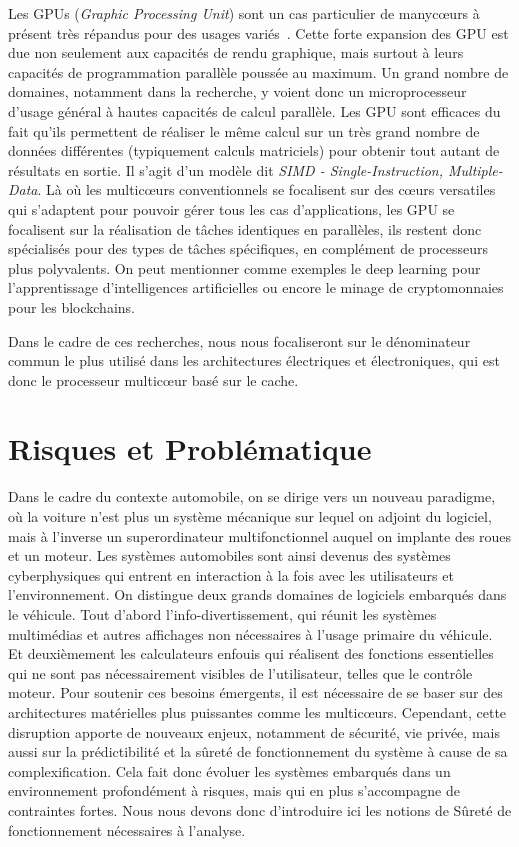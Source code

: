 \documentclass[french, a4paper, 11pt, twoside, pdftex]{StyleThese}
\begin{document}
		Les GPUs (\emph{Graphic Processing Unit}) sont un cas particulier de manycœurs à présent très répandus pour des usages variés~\cite{owens_gpu_2008}. Cette forte expansion des GPU est due non seulement aux capacités de rendu graphique, mais surtout à leurs capacités de programmation parallèle poussée au maximum. Un grand nombre de domaines, notamment dans la recherche, y voient donc un microprocesseur d'usage général à hautes capacités de calcul parallèle.
		Les GPU sont efficaces du fait qu'ils permettent de réaliser le même calcul sur un très grand nombre de données différentes (typiquement calculs matriciels) pour obtenir tout autant de résultats en sortie. Il s'agit d'un modèle dit \emph{SIMD - Single-Instruction, Multiple-Data}. Là où les multicœurs conventionnels se focalisent sur des cœurs versatiles qui s'adaptent pour pouvoir gérer tous les cas d'applications, les GPU se focalisent sur la réalisation de tâches identiques en parallèles, ils restent donc spécialisés pour des types de tâches spécifiques, en complément de processeurs plus polyvalents. On peut mentionner comme exemples le deep learning pour l'apprentissage d'intelligences artificielles ou encore le minage de cryptomonnaies pour les blockchains.
		
		Dans le cadre de ces recherches, nous nous focaliseront sur le dénominateur commun le plus utilisé dans les architectures électriques et électroniques, qui est donc le processeur multicœur basé sur le cache.
		
\section{Risques et Problématique}
	Dans le cadre du contexte automobile, on se dirige  vers un nouveau paradigme, où la voiture n'est plus un système mécanique sur lequel on adjoint du logiciel, mais à l'inverse un superordinateur multifonctionnel auquel on implante des roues et un moteur. 
	Les systèmes automobiles sont ainsi devenus des systèmes cyberphysiques qui entrent en interaction à la fois avec les utilisateurs et l'environnement. On distingue deux grands domaines de logiciels embarqués dans le véhicule. Tout d'abord l'info-divertissement, qui réunit les systèmes multimédias et autres affichages non nécessaires à l'usage primaire du véhicule. Et deuxièmement les calculateurs enfouis qui réalisent des fonctions essentielles qui ne sont pas nécessairement visibles de l'utilisateur, telles que le contrôle moteur. Pour soutenir ces besoins émergents, il est nécessaire de se baser sur des architectures matérielles plus puissantes comme les multicœurs. Cependant, cette disruption apporte de nouveaux enjeux, notamment de sécurité, vie privée, mais aussi sur la prédictibilité et la sûreté de fonctionnement du système à cause de sa complexification. Cela fait donc évoluer les systèmes embarqués dans un environnement profondément à risques, mais qui en plus s'accompagne de contraintes fortes. Nous nous devons donc d'introduire ici les notions de Sûreté de fonctionnement nécessaires à l'analyse.
\end{document}
